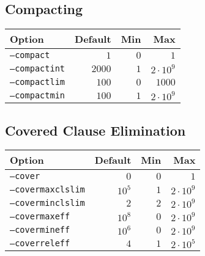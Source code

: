 \documentclass{article}
\begin{document}
\subsection{Compacting}
\begin{tabular}{l|rrr}
    Option & Default & Min & Max \\
    \hline
    \texttt{--compact}     & $1$    & $0$  & $1$ \\
    \texttt{--compactint}  & $2000$ & $1$  & $2 \cdot 10^9$ \\
    \texttt{--compactlim}  & $100$  & $0$  & $1000$ \\
    \texttt{--compactmin}  & $100$  & $1$  & $2 \cdot 10^9$ \\
\end{tabular}

\subsection{Covered Clause Elimination}
\begin{tabular}{l|rrr}
    Option & Default & Min & Max \\
    \hline
    \texttt{--cover}          & $0$    & $0$  & $1$ \\
    \texttt{--covermaxclslim} & $10^5$ & $1$  & $2 \cdot 10^9$ \\
    \texttt{--coverminclslim} & $2$    & $2$  & $2 \cdot 10^9$ \\
    \texttt{--covermaxeff}    & $10^8$ & $0$  & $2 \cdot 10^9$ \\
    \texttt{--covermineff}    & $10^6$ & $0$  & $2 \cdot 10^9$ \\
    \texttt{--coverreleff}    & $4$    & $1$  & $2 \cdot 10^5$ \\
\end{tabular}
\end{document}
